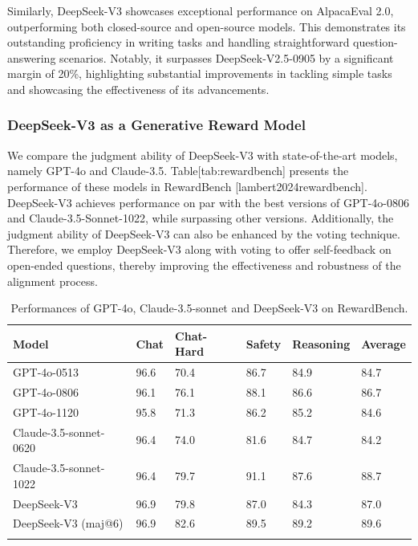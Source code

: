 \documentclass[11pt,a4paper]{article}
\begin{document}
Similarly, DeepSeek-V3 showcases exceptional performance on AlpacaEval 2.0, outperforming both closed-source and open-source models. This demonstrates its outstanding proficiency in writing tasks and handling straightforward question-answering scenarios. Notably, it surpasses DeepSeek-V2.5-0905 by a significant margin of 20\%, highlighting substantial improvements in tackling simple tasks and showcasing the effectiveness of its advancements.

\subsubsection{DeepSeek-V3 as a Generative Reward Model}

We compare the judgment ability of DeepSeek-V3 with state-of-the-art models, namely GPT-4o and Claude-3.5. Table[tab:rewardbench] presents the performance of these models in RewardBench [lambert2024rewardbench]. DeepSeek-V3 achieves performance on par with the best versions of GPT-4o-0806 and Claude-3.5-Sonnet-1022, while surpassing other versions. Additionally, the judgment ability of DeepSeek-V3 can also be enhanced by the voting technique. Therefore, we employ DeepSeek-V3 along with voting to offer self-feedback on open-ended questions, thereby improving the effectiveness and robustness of the alignment process.

\begin{table}[h]
\caption{Performances of GPT-4o, Claude-3.5-sonnet and DeepSeek-V3 on RewardBench.}
\begin{tabular}{|l|l|l|l|l|l|}
\hline
Model & Chat & Chat-Hard & Safety & Reasoning & Average \\ \hline
GPT-4o-0513 & 96.6 & 70.4 & 86.7 & 84.9 & 84.7 \\ \hline
GPT-4o-0806 & 96.1 & 76.1 & 88.1 & 86.6 & 86.7 \\ \hline
GPT-4o-1120 & 95.8 & 71.3 & 86.2 & 85.2 & 84.6 \\ \hline
Claude-3.5-sonnet-0620 & 96.4 & 74.0 & 81.6 & 84.7 & 84.2 \\ \hline
Claude-3.5-sonnet-1022 & 96.4 & 79.7 & 91.1 & 87.6 & 88.7 \\ \hline
DeepSeek-V3 & 96.9 & 79.8 & 87.0 & 84.3 & 87.0 \\ \hline
DeepSeek-V3 (maj@6) & 96.9 & 82.6 & 89.5 & 89.2 & 89.6 \\ \hline
 &  &  &  &  &  \\ \hline
\end{tabular}
\end{table}
\end{document}
